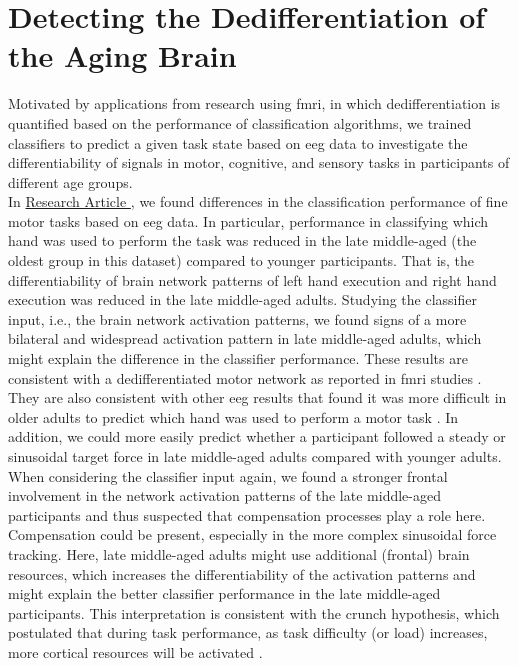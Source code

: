 \section{Detecting the Dedifferentiation of the Aging Brain}
Motivated by applications from research using \gls{fmri}, in which dedifferentiation is quantified based on the performance of classification algorithms, we trained classifiers to predict a given task state based on \gls{eeg} data to investigate the differentiability of signals in motor, cognitive, and sensory tasks in participants of different age groups.\\
In \hyperref[results:paperI]{Research Article }, we found differences in the classification performance of fine motor tasks based on \gls{eeg} data. In particular, performance in classifying which hand was used to perform the task was reduced in the late middle-aged (the oldest group in this dataset) compared to younger participants. That is, the differentiability of brain network patterns of left hand execution and right hand execution was reduced in the late middle-aged adults. Studying the classifier input, i.e., the brain network activation patterns, we found signs of a more bilateral and widespread activation pattern in late middle-aged adults, which might explain the difference in the classifier performance. These results are consistent with a dedifferentiated motor network as reported in \gls{fmri} studies \cite{Carb2011, Cassedy2020}. They are also consistent with other \gls{eeg} results that found it was more difficult in older adults to predict which hand was used to perform a motor task \cite{Chen2019, Zich2015}. In addition, we could more easily predict whether a participant followed a steady or sinusoidal target force in late middle-aged adults compared with younger adults. When considering the classifier input again, we found a stronger frontal involvement in the network activation patterns of the late middle-aged participants and thus suspected that compensation processes play a role here. Compensation could be present, especially in the more complex sinusoidal force tracking. Here, late middle-aged adults might use additional (frontal) brain resources, which increases the differentiability of the activation patterns and might explain the better classifier performance in the late middle-aged participants. This interpretation is consistent with the \gls{crunch} hypothesis, which postulated that during task performance, as task difficulty (or load) increases, more cortical resources will be activated \cite{Festini2018}.\\
